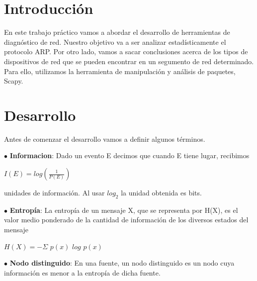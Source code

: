 \documentclass[10pt, a4paper]{article}
\begin{document}

\thispagestyle{empty}

\maketitle

\thispagestyle{empty}
\tableofcontents

\newpage

\section{Introducción}
En este trabajo práctico vamos a abordar el desarrollo de herramientas de diagnóstico de red. Nuestro objetivo va a ser analizar estadísticamente el protocolo ARP. Por otro lado, vamos a sacar conclusiones acerca de los tipos de dispositivos de red que se pueden encontrar en un segumento de red determinado. Para ello, utilizamos la herramienta de manipulación y análisis de paquetes, Scapy.

\section{Desarrollo}
Antes de comenzar el desarrollo vamos a definir algunos términos.

$\bullet$ \textbf{Informacion}: Dado un evento E decimos que cuando E tiene lugar, recibimos
\begin{center}
$I (E) = log(\frac{1}{P(E)})$ 
\end{center}

unidades de información. Al usar $log_2$ la unidad obtenida es bits.

$\bullet$ \textbf{Entropía}: La entropía de un mensaje X, que se representa por H(X), es el valor medio ponderado de la cantidad de información de los diversos estados del mensaje 

\begin{center}
$H(X) = - \Sigma$ $p(x)$ $log$ $p(x)$
\end{center}

$\bullet$ \textbf{Nodo distinguido}: En una fuente, un nodo distinguido es un nodo cuya información es menor a la entropía de dicha fuente.
\end{document}
